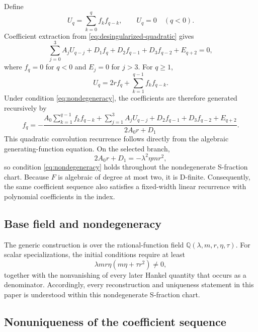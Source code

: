 \documentclass[11pt]{article}
\theoremstyle{remark}
\begin{document}
Define
\begin{equation}
 U_q=\sum_{k=0}^{q}f_kf_{q-k},\qquad U_q=0\quad(q<0).
 \label{eq:Uq}
\end{equation}
Coefficient extraction from \eqref{eq:desingularized-quadratic} gives
\begin{equation}
 \sum_{j=0}^{3}A_jU_{q-j}
 +D_1f_q+D_2f_{q-1}+D_3f_{q-2}+E_{q+2}=0,
 \label{eq:convolution}
\end{equation}
where $f_q=0$ for $q<0$ and $E_j=0$ for $j>3$.  For $q\geq1$,
\begin{equation}
 U_q=2rf_q+\sum_{k=1}^{q-1}f_kf_{q-k}.
 \label{eq:Uq-split}
\end{equation}
Under condition \eqref{eq:nondegeneracy}, the coefficients are therefore generated
recursively by
\begin{equation}
 f_q=-\frac{
 A_0\displaystyle\sum_{k=1}^{q-1}f_kf_{q-k}
 +\displaystyle\sum_{j=1}^{3}A_jU_{q-j}
 +D_2f_{q-1}+D_3f_{q-2}+E_{q+2}}
 {2A_0r+D_1}.
 \label{eq:coefficient-recurrence}
\end{equation}
This quadratic convolution recurrence follows directly from the algebraic
generating-function equation.  On the selected branch,
\begin{equation}
 2A_0r+D_1=-\lambda^2\eta mr^2,
 \label{eq:selected-branch-denominator}
\end{equation}
so condition \eqref{eq:nondegeneracy} holds throughout the nondegenerate
S-fraction chart.  Because $F$ is algebraic of degree at most two, it is
D-finite.  Consequently, the same coefficient sequence also satisfies a
fixed-width linear recurrence with polynomial coefficients in the index.

\subsection{Base field and nondegeneracy}
The generic construction is over the rational-function field
$\mathbb Q(\lambda,m,r,\eta,\tau)$.  For scalar specializations, the initial
conditions require at least
\[
 \lambda mr\eta(m\eta+\tau r^2)\ne0,
\]
together with the nonvanishing of every later Hankel quantity that occurs as
a denominator.  Accordingly, every reconstruction and uniqueness statement
in this paper is understood within this nondegenerate S-fraction chart.

\subsection{Nonuniqueness of the coefficient sequence}
\label{sec:nonuniqueness}
\end{document}
